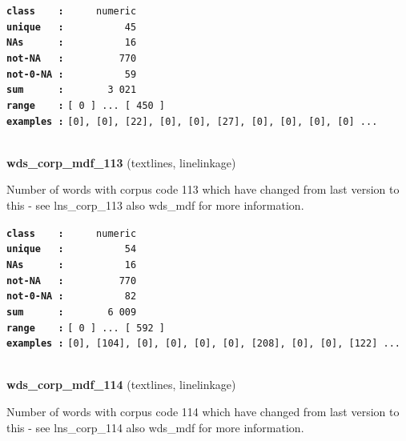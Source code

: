 \documentclass[]{article}
\begin{document}
\textbf{\texttt{class\ \ \ \ :}} \texttt{~~~~~numeric}\\
\textbf{\texttt{unique\ \ \ :}} \texttt{~~~~~~~~~~45}\\
\textbf{\texttt{NAs\ \ \ \ \ \ :}} \texttt{~~~~~~~~~~16}\\
\textbf{\texttt{not-NA\ \ \ :}} \texttt{~~~~~~~~~770}\\
\textbf{\texttt{not-0-NA\ :}} \texttt{~~~~~~~~~~59}\\
\textbf{\texttt{sum\ \ \ \ \ \ :}} \texttt{~~~~~~~3~021}\\
\textbf{\texttt{range\ \ \ \ :}}
\texttt{{[}\ 0\ {]}\ ...\ {[}\ 450\ {]}}\\
\textbf{\texttt{examples\ :}}
\texttt{{[}0{]},\ {[}0{]},\ {[}22{]},\ {[}0{]},\ {[}0{]},\ {[}27{]},\ {[}0{]},\ {[}0{]},\ {[}0{]},\ {[}0{]}\ ...}\\

~

\textbf{wds\_corp\_mdf\_113} (textlines, linelinkage)

Number of words with corpus code 113 which have changed from last
version to this - see lns\_corp\_113 also wds\_mdf for more information.

\textbf{\texttt{class\ \ \ \ :}} \texttt{~~~~~numeric}\\
\textbf{\texttt{unique\ \ \ :}} \texttt{~~~~~~~~~~54}\\
\textbf{\texttt{NAs\ \ \ \ \ \ :}} \texttt{~~~~~~~~~~16}\\
\textbf{\texttt{not-NA\ \ \ :}} \texttt{~~~~~~~~~770}\\
\textbf{\texttt{not-0-NA\ :}} \texttt{~~~~~~~~~~82}\\
\textbf{\texttt{sum\ \ \ \ \ \ :}} \texttt{~~~~~~~6~009}\\
\textbf{\texttt{range\ \ \ \ :}}
\texttt{{[}\ 0\ {]}\ ...\ {[}\ 592\ {]}}\\
\textbf{\texttt{examples\ :}}
\texttt{{[}0{]},\ {[}104{]},\ {[}0{]},\ {[}0{]},\ {[}0{]},\ {[}0{]},\ {[}208{]},\ {[}0{]},\ {[}0{]},\ {[}122{]}\ ...}\\

~

\textbf{wds\_corp\_mdf\_114} (textlines, linelinkage)

Number of words with corpus code 114 which have changed from last
version to this - see lns\_corp\_114 also wds\_mdf for more information.
\end{document}
